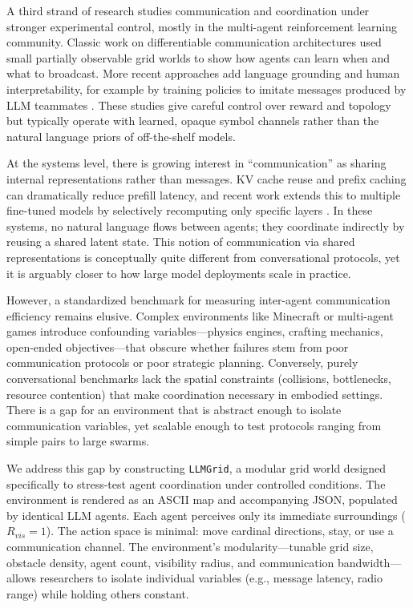 \documentclass[10pt,twocolumn]{article}
\begin{document}
A third strand of research studies communication and coordination under stronger experimental control, mostly in the multi-agent reinforcement learning community. Classic work on differentiable communication architectures used small partially observable grid worlds to show how agents can learn when and what to broadcast. More recent approaches add language grounding and human interpretability, for example by training policies to imitate messages produced by LLM teammates \citep{li2024language}. These studies give careful control over reward and topology but typically operate with learned, opaque symbol channels rather than the natural language priors of off-the-shelf models.

At the systems level, there is growing interest in ``communication'' as sharing internal representations rather than messages. KV cache reuse and prefix caching can dramatically reduce prefill latency, and recent work extends this to multiple fine-tuned models by selectively recomputing only specific layers \citep{liu2025droidspeak}. In these systems, no natural language flows between agents; they coordinate indirectly by reusing a shared latent state. This notion of communication via shared representations is conceptually quite different from conversational protocols, yet it is arguably closer to how large model deployments scale in practice.

However, a standardized benchmark for measuring inter-agent communication efficiency remains elusive. Complex environments like Minecraft or multi-agent games introduce confounding variables—physics engines, crafting mechanics, open-ended objectives—that obscure whether failures stem from poor communication protocols or poor strategic planning. Conversely, purely conversational benchmarks lack the spatial constraints (collisions, bottlenecks, resource contention) that make coordination necessary in embodied settings. There is a gap for an environment that is abstract enough to isolate communication variables, yet scalable enough to test protocols ranging from simple pairs to large swarms.

We address this gap by constructing \texttt{LLMGrid}, a modular grid world designed specifically to stress-test agent coordination under controlled conditions. The environment is rendered as an ASCII map and accompanying JSON, populated by identical LLM agents. Each agent perceives only its immediate surroundings ($R_{vis}=1$). The action space is minimal: move cardinal directions, stay, or use a communication channel. The environment's modularity—tunable grid size, obstacle density, agent count, visibility radius, and communication bandwidth—allows researchers to isolate individual variables (e.g., message latency, radio range) while holding others constant.
\end{document}
